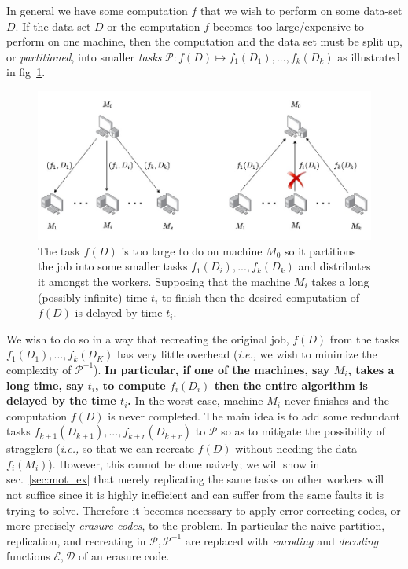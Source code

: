 \documentclass{report}
\begin{document}
In general we have some computation $f$ that we wish to perform on some data-set $D$. If the data-set $D$ or the computation $f$ becomes too large/expensive to perform on one machine, then the computation and the data set must be split up, or \emph{partitioned}, into smaller \emph{tasks} $\mathcal{P} : f(D) \mapsto f_1(D_1) ,..., f_k(D_k)$ as illustrated in fig~\ref{fig:1}. 
\begin{figure}
    \centering
    \includegraphics[width=\textwidth]{straggler_diag_1.jpg}
    \caption{The task $f(D)$ is too large to do on machine $M_0$ so it partitions the job into some smaller tasks $f_1(D_i), ..., f_k(D_k)$ and distributes it amongst the workers. Supposing that the machine $M_i$ takes a long (possibly infinite) time $t_i$ to finish then the desired computation of $f(D)$ is delayed by time $t_i$.}
    \label{fig:1}
\end{figure}
We wish to do so in a way that recreating the original job, $f(D)$ from the tasks $f_1(D_1) , ..., f_k(D_K)$ has very little overhead (\emph{i.e.,} we wish to minimize the complexity of $\mathcal{P}^{-1}$). 
\textbf{In particular, if one of the machines, say $M_i$, takes a long time, say $t_i$, to compute $f_i(D_i)$ then the entire algorithm is delayed by the time $t_i$.} In the worst case, machine $M_i$ never finishes and the computation $f(D)$ is never completed. 
The main idea is to add some redundant tasks $f_{k+1}(D_{k+1}),...,f_{k+r}(D_{k+r})$ to $\mathcal{P}$ so as to mitigate the possibility of stragglers (\emph{i.e.,} so that we can recreate $f(D)$ without needing the data $f_i(M_i)$).
However, this cannot be done naively; we will show in sec.~\ref{sec:mot_ex} that merely replicating the same tasks on other workers will not suffice since it is highly inefficient and can suffer from the same faults it is trying to solve. Therefore it becomes necessary to apply error-correcting codes, or more precisely \textit{erasure codes}, to the problem. In particular the naive partition, replication, and recreating in $\mathcal{P},\mathcal{P}^{-1}$ are replaced with \emph{encoding} and \emph{decoding} functions $\mathcal{E},\mathcal{D}$ of an erasure code. 
\end{document}
